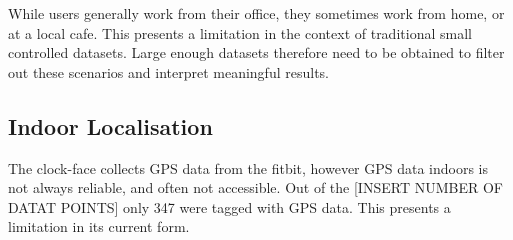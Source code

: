 

While users generally work from their office, they sometimes work from home, or at a local cafe. This presents a limitation in the context of traditional small controlled datasets. Large enough datasets therefore need to be obtained to filter out these scenarios and interpret meaningful results.









\subsection{Indoor Localisation}
\label{ch:localisation}

The clock-face collects GPS data from the fitbit, however GPS data indoors is not always reliable, and often not accessible. Out of the [INSERT NUMBER OF DATAT POINTS] only 347 were tagged with GPS data. This presents a limitation in its current form. \

